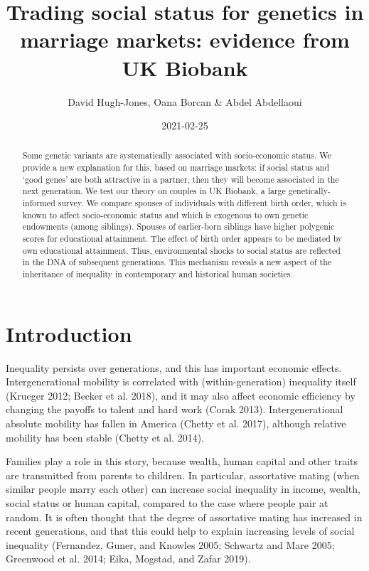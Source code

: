 \documentclass[
]{article}
\title{Trading social status for genetics in marriage markets: evidence from UK Biobank}
\author{David Hugh-Jones, Oana Borcan \& Abdel Abdellaoui}
\date{2021-02-25}
\begin{document}
\maketitle
\begin{abstract}
Some genetic variants are systematically associated with
socio-economic status. We provide a new explanation for this, based on
marriage markets: if social status and `good genes' are both attractive in
a partner, then they will become associated in the next generation. We test
our theory on couples in UK Biobank, a large genetically-informed survey.
We compare spouses of individuals with different birth order, which is
known to affect socio-economic status and which is
exogenous to own genetic endowments (among siblings). Spouses of
earlier-born siblings have higher polygenic scores for educational
attainment. The effect of birth order appears to be mediated by own
educational attainment. Thus, environmental shocks to social status are
reflected in the DNA of subsequent generations. This mechanism reveals a
new aspect of the inheritance of inequality in contemporary and
historical human societies.
\end{abstract}

\normalem

\hypertarget{introduction}{%
\section{Introduction}\label{introduction}}

Inequality persists over generations, and this has important economic
effects. Intergenerational mobility is correlated with
(within-generation) inequality itself (Krueger 2012; Becker et al. 2018), and it may also affect economic efficiency by
changing the payoffs to talent and hard work (Corak 2013).
Intergenerational absolute mobility has fallen in America
(Chetty et al. 2017), although relative mobility has been stable
(Chetty et al. 2014).

Families play a role in this story, because wealth, human capital and
other traits are transmitted from parents to children. In particular,
assortative mating (when similar people marry each other) can increase
social inequality in income, wealth, social status or human capital,
compared to the case where people pair at random. It is often thought
that the degree of assortative mating has increased in recent
generations, and that this could help to explain increasing levels of
social inequality (Fernandez, Guner, and Knowles 2005; Schwartz and Mare 2005; Greenwood et al. 2014; Eika, Mogstad, and Zafar 2019).
\end{document}
